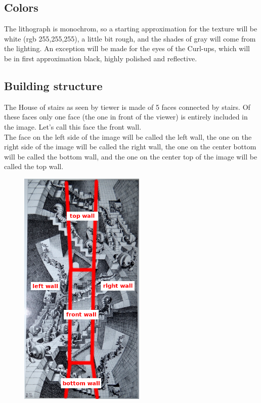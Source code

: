 \documentclass[12pt, a4paper]{article}
\begin{document}
\subsection{Colors}

The lithograph is monochrom, so a starting approximation for the texture will be white (rgb 255,255,255), a little bit rough, and the shades of gray will come from the lighting. An exception will be made for the eyes of the Curl-ups, which will be in first approximation black, highly polished and reflective.\\

\subsection{Building structure}

The House of stairs as seen by tiewer is made of 5 faces connected by stairs. Of these faces only one face (the one in front of the viewer) is entirely included in the image. Let's call this face the front wall.\\

The face on the left side of the image will be called the left wall, the one on the right side of the image will be called the right wall, the one on the center bottom will be called the bottom wall, and the one on the center top of the image will be called the top wall.\\

\begin{center}
\begin{figure}[H]
\centering\includegraphics[width=6cm]{./walls.png}\\
\end{figure}
\end{center}
\end{document}
